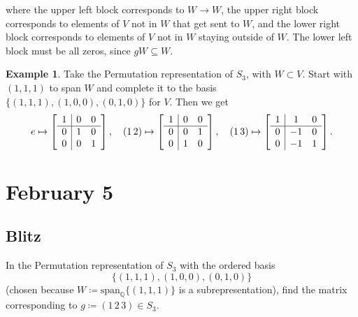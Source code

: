 \documentclass[12pt]{article}
\newcommand{\q}{\mathbb{Q}}
\newcommand{\spank}[1]{\mathrm{span}_{#1}}
\theoremstyle{definition}
\newtheorem{example}{Example}[section]
\begin{document}
where the upper left block corresponds to $W\to W$, the upper right block corresponds to elements of $V$ not in $W$ that get sent to $W$, and the lower right block corresponds to elements of $V$ not in $W$ staying outside of $W$. The lower left block must be all zeros, since $gW\subseteq W$.
\begin{example}
    Take the Permutation representation of $S_3$, with $W\subset V$. Start with $(1,1,1)$ to span $W$ and complete it to the basis $\{(1,1,1),(1,0,0),(0,1,0)\}$ for $V$. Then we get
    \begin{equation}
        e\mapsto
        \left[\begin{array}{c | c c}
            1 & 0 & 0 \\
            \hline 
            0 & 1 & 0 \\
            0 & 0 & 1  
        \end{array}
        \right],
        \quad
        (1\,2)\mapsto
        \left[\begin{array}{c | c c}
            1 & 0 & 0 \\
            \hline 
            0 & 0 & 1 \\
            0 & 1 & 0  
        \end{array}
        \right],
        \quad
        (1\,3)\mapsto
        \left[\begin{array}{c | c c}
            1 & 1 & 0 \\
            \hline 
            0 & -1 & 0 \\
            0 & -1 & 1  
        \end{array}
        \right].
    \end{equation}
\end{example}
\section{February 5}
\subsection{Blitz}
In the Permutation representation of $S_3$ with the ordered basis 
\[\{(1,1,1),(1,0,0),(0,1,0)\}\]
(chosen because $W\coloneqq \spank{\q}\{(1,1,1)\}$ is a subrepresentation), find the matrix corresponding to $g\coloneqq (1\,2\,3)\in S_3$.
\end{document}
